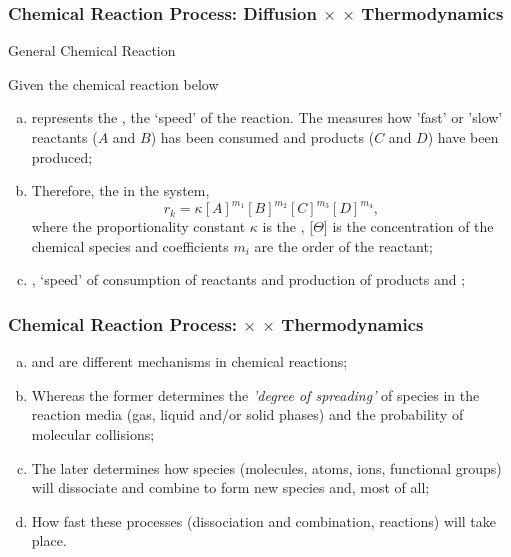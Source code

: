 \documentclass[10pt,compress,handout,unknownkeysallowed]{beamer}
\begin{document}
\begin{frame}
  \frametitle{Chemical Reaction Process: Diffusion $\times$  $\times$ Thermodynamics}

  \begin{block}{\begin{center}General Chemical Reaction\end{center}}
     Given the chemical reaction below
  \end{block}  

   \begin{enumerate}[a)]
       \item<1->  represents the , \ie the `speed' of the reaction. The  measures how 'fast' or 'slow' reactants ($A$ and $B$) has been consumed and products ($C$ and $D$) have been produced;
       \item<1-> Therefore, the  in the system, \eg
             \begin{displaymath}
                  r_{k} = \kappa [A]^{m_{1}}[B]^{m_{2}}[C]^{m_{3}}[D]^{m_{4}},
             \end{displaymath}
             where the proportionality constant $\kappa$ is the , [$\Theta$] is the concentration of the chemical species and coefficients $m_{i}$ are the order of the reactant;
       \item<1-> , \ie `speed' of consumption of reactants and production of products and ;
   \end{enumerate}
\end{frame}
\normalsize

\begin{frame}
  \frametitle{Chemical Reaction Process:  $\times$  $\times$ Thermodynamics}


   \begin{enumerate}[a)]
       \item<1->  and  are different mechanisms in chemical reactions;
       \item<2-> Whereas the former determines the {\it 'degree of spreading'} of species in the reaction media (\ie gas, liquid and/or solid phases) and the probability of molecular collisions;
       \item<3-> The later determines how species (\ie molecules, atoms, ions, functional groups) will dissociate and combine to form new species and, most of all;
        \item<4-> How fast these processes (dissociation and combination, \ie reactions) will take place.
   \end{enumerate}
\end{frame}
\normalsize
\end{document}
